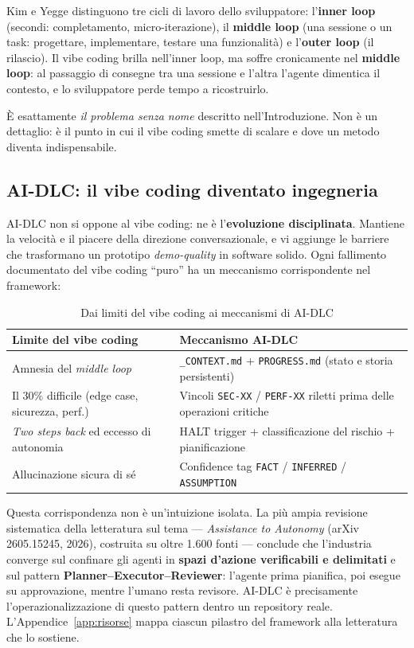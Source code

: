 Kim e Yegge distinguono tre cicli di lavoro dello sviluppatore: l'\textbf{inner loop} (secondi: completamento, micro-iterazione), il \textbf{middle loop} (una sessione o un task: progettare, implementare, testare una funzionalità) e l'\textbf{outer loop} (il rilascio). Il vibe coding brilla nell'inner loop, ma soffre cronicamente nel \textbf{middle loop}: al passaggio di consegne tra una sessione e l'altra l'agente dimentica il contesto, e lo sviluppatore perde tempo a ricostruirlo.

È esattamente \textit{il problema senza nome} descritto nell'Introduzione. Non è un dettaglio: è il punto in cui il vibe coding smette di scalare e dove un metodo diventa indispensabile.

\subsection*{AI-DLC: il vibe coding diventato ingegneria}

AI-DLC non si oppone al vibe coding: ne è l'\textbf{evoluzione disciplinata}. Mantiene la velocità e il piacere della direzione conversazionale, e vi aggiunge le barriere che trasformano un prototipo \textit{demo-quality} in software solido. Ogni fallimento documentato del vibe coding ``puro'' ha un meccanismo corrispondente nel framework:

\begin{table}[htbp]
  \centering
  \begin{tabular}{ll}
    \toprule
    \textbf{Limite del vibe coding} & \textbf{Meccanismo AI-DLC} \\
    \midrule
    Amnesia del \textit{middle loop} & \texttt{\_CONTEXT.md} + \texttt{PROGRESS.md} (stato e storia persistenti) \\
    Il 30\% difficile (edge case, sicurezza, perf.) & Vincoli \texttt{SEC-XX} / \texttt{PERF-XX} riletti prima delle operazioni critiche \\
    \textit{Two steps back} ed eccesso di autonomia & HALT trigger + classificazione del rischio + pianificazione \\
    Allucinazione sicura di sé & Confidence tag \texttt{FACT} / \texttt{INFERRED} / \texttt{ASSUMPTION} \\
    \bottomrule
  \end{tabular}
  \caption{Dai limiti del vibe coding ai meccanismi di AI-DLC}
  \label{tab:01-vibe-vs-aidlc}
\end{table}

Questa corrispondenza non è un'intuizione isolata. La più ampia revisione sistematica della letteratura sul tema --- \textit{Assistance to Autonomy} (arXiv 2605.15245, 2026), costruita su oltre 1.600 fonti --- conclude che l'industria converge sul confinare gli agenti in \textbf{spazi d'azione verificabili e delimitati} e sul pattern \textbf{Planner--Executor--Reviewer}: l'agente prima pianifica, poi esegue su approvazione, mentre l'umano resta revisore. AI-DLC è precisamente l'operazionalizzazione di questo pattern dentro un repository reale. L'Appendice~\ref{app:risorse} mappa ciascun pilastro del framework alla letteratura che lo sostiene.

